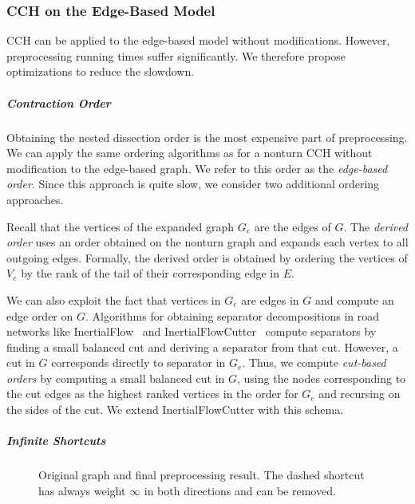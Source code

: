 \documentclass[a4paper, english, cleveref]{lipics-v2021}
\begin{document}
\subsubsection{CCH on the Edge-Based Model}
\label{sec:cch-on-edge-based-model}

CCH can be applied to the edge-based model without modifications.
However, preprocessing running times suffer significantly.
We therefore propose optimizations to reduce the slowdown.

\subparagraph*{Contraction Order}

Obtaining the nested dissection order is the most expensive part of preprocessing.
We can apply the same ordering algorithms as for a nonturn CCH without modification to the edge-based graph.
We refer to this order as the \emph{edge-based order}.
Since this approach is quite slow, we consider two additional ordering approaches.

Recall that the vertices of the expanded graph $G_e$ are the edges of $G$.
The \emph{derived order} uses an order obtained on the nonturn graph and expands each vertex to all outgoing edges.
Formally, the derived order is obtained by ordering the vertices of $V_e$ by the rank of the tail of their corresponding edge in $E$.

We can also exploit the fact that vertices in $G_e$ are edges in $G$ and compute an edge order on $G$.
Algorithms for obtaining separator decompositions in road networks like InertialFlow~\cite{SchildS15} and InertialFlowCutter~\cite{GottesburenHUW19} compute separators by finding a small balanced cut and deriving a separator from that cut.
However, a cut in $G$ corresponds directly to separator in $G_e$.
Thus, we compute \emph{cut-based orders} by computing a small balanced cut in $G$, using the nodes corresponding to the cut edges as the highest ranked vertices in the order for $G_e$ and recursing on the sides of the cut.
We extend InertialFlowCutter with this schema.

\subparagraph*{Infinite Shortcuts}

\begin{figure}[tb]
  \centering
  
  \caption{Original graph and final preprocessing result. The dashed shortcut has always weight $\infty$ in both directions and can be removed.}
  \label{fig:infinite-shortcut}
\end{figure}
\end{document}
